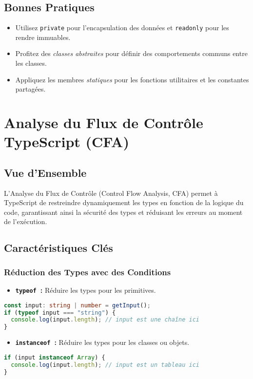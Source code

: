 \documentclass[a4paper,12pt]{article}
\begin{document}
\subsection*{Bonnes Pratiques}
\begin{itemize}
    \item Utilisez \texttt{private} pour l'encapsulation des données et \texttt{readonly} pour les rendre immuables.
    \item Profitez des \textit{classes abstraites} pour définir des comportements communs entre les classes.
    \item Appliquez les membres \textit{statiques} pour les fonctions utilitaires et les constantes partagées.
\end{itemize}

\section{Analyse du Flux de Contrôle TypeScript (CFA)}
\subsection*{Vue d’Ensemble}
L'Analyse du Flux de Contrôle (Control Flow Analysis, CFA) permet à TypeScript de restreindre dynamiquement les types en fonction de la logique du code, garantissant ainsi la sécurité des types et réduisant les erreurs au moment de l'exécution.

\subsection*{Caractéristiques Clés}
\subsubsection*{Réduction des Types avec des Conditions}
\begin{itemize}
    \item \textbf{\texttt{typeof} :} Réduire les types pour les primitives.
\end{itemize}
\begin{lstlisting}[language=TypeScript]
const input: string | number = getInput();
if (typeof input === "string") {
  console.log(input.length); // input est une chaîne ici
}
\end{lstlisting}

\begin{itemize}
    \item \textbf{\texttt{instanceof} :} Réduire les types pour les classes ou objets.
\end{itemize}
\begin{lstlisting}[language=TypeScript]
if (input instanceof Array) {
  console.log(input.length); // input est un tableau ici
}
\end{lstlisting}
\end{document}
